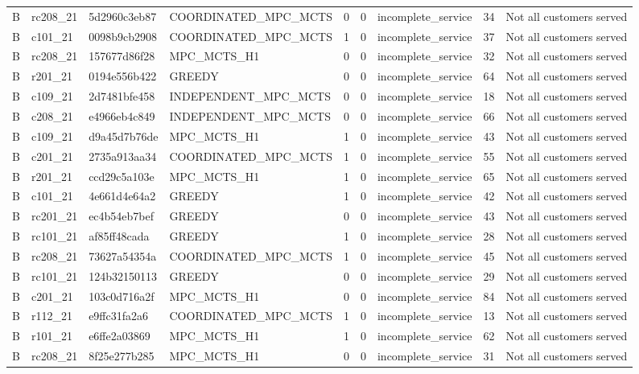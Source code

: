 \begin{table}
{\begin{tabular}{llllrrlrl}
B & rc208\_21 & 5d2960c3eb87 & COORDINATED\_MPC\_MCTS & 0 & 0 & incomplete\_service & 34 & Not all customers served \\
B & c101\_21 & 0098b9cb2908 & COORDINATED\_MPC\_MCTS & 1 & 0 & incomplete\_service & 37 & Not all customers served \\
B & rc208\_21 & 157677d86f28 & MPC\_MCTS\_H1 & 0 & 0 & incomplete\_service & 32 & Not all customers served \\
B & r201\_21 & 0194e556b422 & GREEDY & 0 & 0 & incomplete\_service & 64 & Not all customers served \\
B & c109\_21 & 2d7481bfe458 & INDEPENDENT\_MPC\_MCTS & 0 & 0 & incomplete\_service & 18 & Not all customers served \\
B & c208\_21 & e4966eb4c849 & INDEPENDENT\_MPC\_MCTS & 0 & 0 & incomplete\_service & 66 & Not all customers served \\
B & c109\_21 & d9a45d7b76de & MPC\_MCTS\_H1 & 1 & 0 & incomplete\_service & 43 & Not all customers served \\
B & c201\_21 & 2735a913aa34 & COORDINATED\_MPC\_MCTS & 1 & 0 & incomplete\_service & 55 & Not all customers served \\
B & r201\_21 & ccd29c5a103e & MPC\_MCTS\_H1 & 1 & 0 & incomplete\_service & 65 & Not all customers served \\
B & c101\_21 & 4e661d4e64a2 & GREEDY & 1 & 0 & incomplete\_service & 42 & Not all customers served \\
B & rc201\_21 & ec4b54eb7bef & GREEDY & 0 & 0 & incomplete\_service & 43 & Not all customers served \\
B & rc101\_21 & af85ff48cada & GREEDY & 1 & 0 & incomplete\_service & 28 & Not all customers served \\
B & rc208\_21 & 73627a54354a & COORDINATED\_MPC\_MCTS & 1 & 0 & incomplete\_service & 45 & Not all customers served \\
B & rc101\_21 & 124b32150113 & GREEDY & 0 & 0 & incomplete\_service & 29 & Not all customers served \\
B & c201\_21 & 103c0d716a2f & MPC\_MCTS\_H1 & 0 & 0 & incomplete\_service & 84 & Not all customers served \\
B & r112\_21 & e9ffc31fa2a6 & COORDINATED\_MPC\_MCTS & 1 & 0 & incomplete\_service & 13 & Not all customers served \\
B & r101\_21 & e6ffe2a03869 & MPC\_MCTS\_H1 & 1 & 0 & incomplete\_service & 62 & Not all customers served \\
B & rc208\_21 & 8f25e277b285 & MPC\_MCTS\_H1 & 0 & 0 & incomplete\_service & 31 & Not all customers served \\

\end{tabular}}
\end{table}
